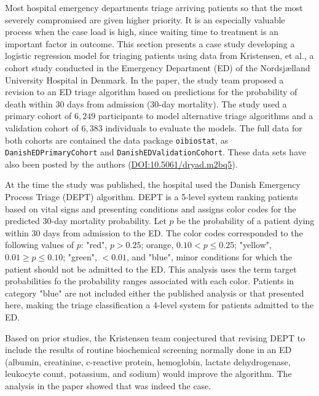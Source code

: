 Most hospital emergency departments triage arriving patients so that the most severely compromised  are given higher priority. It is an especially valuable process when the case load is high, since waiting time to treatment is an important factor in outcome.  This section presents a case study developing a logistic regression model for triaging patients using data from Kristensen, et al., a cohort study conducted in the Emergency Department (ED) of the Nordsj{\ae}lland University Hospital in Denmark.  In the paper, the study team proposed a revision to an ED triage algorithm based on predictions for the probability of death within 30 days from admission (30-day mortality).  The study used a primary cohort of $6,249$ participants to model alternative triage algorithms and a validation cohort of $6,383$ individuals to evaluate the models.   The full data for both cohorts are contained the data package \texttt{oibiostat}, as \texttt{DanishEDPrimaryCohort} and \texttt{DanishEDValidationCohort}.  These data sets have also been posted by the authors (\url{DOI:10.5061/dryad.m2bq5}).


At the time the study was published, the hospital used the Danish Emergency Process Triage (DEPT) algorithm.  DEPT is a 5-level system ranking patients based on vital signs and presenting conditions and assigns color codes for the predicted 30-day mortality probability.  Let $p$ be the probability of a patient dying within 30 days from admission to the ED\@.  The color codes corresponded to the following values of $p$: "red", $p > 0.25$; orange, $0.10 < p \leq 0.25$; "yellow",  $0.01 \geq  p  \leq 0.10$; "green",  $ < 0.01$, and "blue", minor conditions for which the patient should not be admitted to the ED\@. This analysis uses the term target probabilities fo the probability ranges associated with each color. Patients in category "blue" are not included either the published analysis or that presented here, making the triage classification a 4-level system for patients admitted to the ED\@.

Based on prior studies, the Kristensen team conjectured that revising DEPT to include the results of routine biochemical screening normally done in an ED (albumin, creatinine, c-reactive protein, hemoglobin, lactate dehydrogenase, leukocyte count, potassium, and sodium) would improve the algorithm.  The analysis in the paper showed that was indeed the case.

